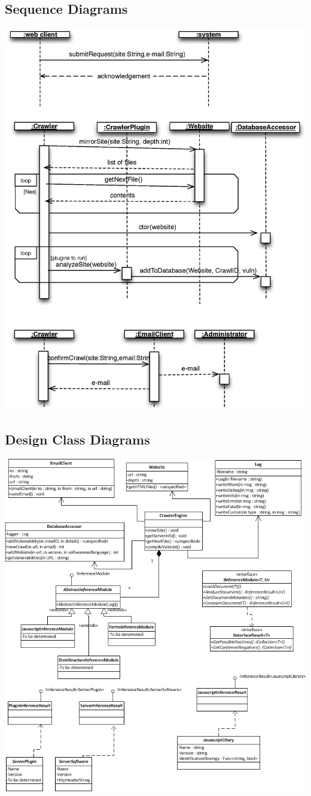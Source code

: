 \documentclass{article}
\begin{document}
\subsection{Sequence Diagrams}
\includegraphics[width=\textwidth]{SeqDia}
\newpage
\subsection{Design Class Diagrams}
\includegraphics[width=\textwidth]{DCD_updated}
\newpage
\end{document}
